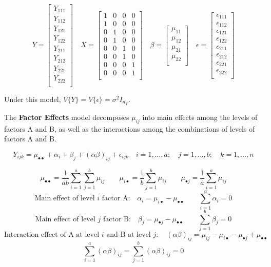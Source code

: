 \documentclass[
]{book}
\begin{document}
\[
Y=
\begin{bmatrix}
Y_{111} \\Y_{112}\\ Y_{121}\\Y_{122}\\Y_{211}\\Y_{212}\\Y_{221}\\Y_{222}\\
\end{bmatrix}
\quad
X=
\begin{bmatrix}
1 & 0 & 0 & 0 \\ 1 & 0 & 0 & 0\\
0 & 1 & 0 & 0 \\ 0 & 1 & 0 & 0\\
0 & 0 & 1 & 0 \\ 0 & 0 & 1 & 0\\
0 & 0 & 0 & 1 \\ 0 & 0 & 0 & 1\\
\end{bmatrix}
\quad
\beta=
\begin{bmatrix}
\mu_{11} \\ \mu_{12}  \\ \mu_{21} \\ \mu_{22}\\
\end{bmatrix}
\quad
\epsilon =
\begin{bmatrix}
\epsilon_{111} \\\epsilon_{112}\\ \epsilon_{121}\\\epsilon_{122}\\
\epsilon_{211}\\\epsilon_{212}\\\epsilon_{221}\\\epsilon_{222}\\
\end{bmatrix}
\]

Under this model, \(V\{Y\}=V\{\epsilon\}=\sigma^2I_{n_T}\).

The \textbf{Factor Effects} model decomposes \(\mu_{ij}\) into main
effects among the levels of factors A and B, as well as the interactions
among the combinations of levels of factors A and B.

\[
Y_{ijk}=\mu_{\bullet\bullet}+\alpha_i+\beta_j+\left(\alpha\beta\right)_{ij}+\epsilon_{ijk} \quad i=1,\ldots,a;\quad j= 1,\ldots,b; \quad k=1,\ldots,n
\]

\[
 \mu_{\bullet\bullet}=\frac{1}{ab}\sum_{i=1}^a\sum_{j=1}^b\mu_{ij} 
 \qquad
 \mu_{i\bullet}=\frac{1}{b}\sum_{j=1}^b\mu_{ij}
 \qquad
\mu_{\bullet j}=\frac{1}{a}\sum_{i=1}^a\mu_{ij}
\] \[
\mbox{Main effect of level } i \mbox{ factor A:} \quad
\alpha_i = \mu_{i\bullet} - \mu_{\bullet\bullet} \qquad
\sum_{i=1}^a \alpha_i=0
\] \[
\mbox{Main effect of level } j \mbox{ factor B:} \quad
\beta_j = \mu_{\bullet j} - \mu_{\bullet\bullet} \qquad
\sum_{j=1}^b \beta_j=0
\] \[
\mbox{Interaction effect of A at level } i \mbox{ and B at level } j:
\quad
\left(\alpha\beta\right)_{ij} =
\mu_{ij}-\mu_{i\bullet}-\mu_{\bullet j}+\mu_{\bullet\bullet}
\] \[
\sum_{i=1}^a\left(\alpha\beta\right)_{ij} =
\sum_{j=1}^b\left(\alpha\beta\right)_{ij}=0
\]
\end{document}
